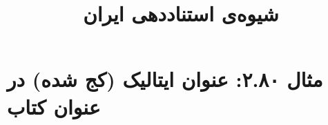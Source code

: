 \documentclass[a4paper,10pt]{article}
\begin{document}
\title{شیوه‌ی استناددهی ایران
 }
\author{}
\date{}
\maketitle



\section*{مثال ۲.۸۰: عنوان ایتالیک (کج شده) در عنوان کتاب}

\cite{حشمتزاد1378}\\
\cite{suangtho1990}\\






\end{document}
